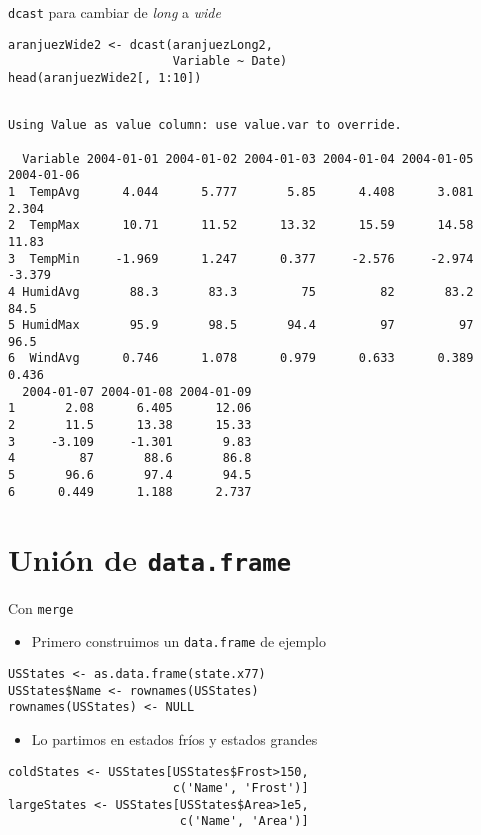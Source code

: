 \documentclass[xcolor={usenames,svgnames,dvipsnames}]{beamer}
\begin{document}
\begin{frame}[label={sec:org8553cc9},fragile]{\texttt{dcast} para cambiar de \emph{long} a \emph{wide}}
 \lstset{language=r,label= ,caption= ,captionpos=b,numbers=none}
\begin{lstlisting}
aranjuezWide2 <- dcast(aranjuezLong2,
                       Variable ~ Date)
head(aranjuezWide2[, 1:10])
\end{lstlisting}

\begin{verbatim}

Using Value as value column: use value.var to override.

  Variable 2004-01-01 2004-01-02 2004-01-03 2004-01-04 2004-01-05 2004-01-06
1  TempAvg      4.044      5.777       5.85      4.408      3.081      2.304
2  TempMax      10.71      11.52      13.32      15.59      14.58      11.83
3  TempMin     -1.969      1.247      0.377     -2.576     -2.974     -3.379
4 HumidAvg       88.3       83.3         75         82       83.2       84.5
5 HumidMax       95.9       98.5       94.4         97         97       96.5
6  WindAvg      0.746      1.078      0.979      0.633      0.389      0.436
  2004-01-07 2004-01-08 2004-01-09
1       2.08      6.405      12.06
2       11.5      13.38      15.33
3     -3.109     -1.301       9.83
4         87       88.6       86.8
5       96.6       97.4       94.5
6      0.449      1.188      2.737
\end{verbatim}
\end{frame}


\section{Unión de \texttt{data.frame}}
\label{sec:orge9ba0b8}
\begin{frame}[label={sec:orgfb1994b},fragile]{Con \texttt{merge}}
 \begin{itemize}
\item Primero construimos un \texttt{data.frame} de ejemplo
\end{itemize}
\lstset{language=r,label= ,caption= ,captionpos=b,numbers=none}
\begin{lstlisting}
USStates <- as.data.frame(state.x77)
USStates$Name <- rownames(USStates)
rownames(USStates) <- NULL
\end{lstlisting}

\begin{itemize}
\item Lo partimos en estados \guillemotleft{}fríos\guillemotright{} y estados \guillemotleft{}grandes\guillemotright{}
\end{itemize}
\lstset{language=r,label= ,caption= ,captionpos=b,numbers=none}
\begin{lstlisting}
coldStates <- USStates[USStates$Frost>150,
                       c('Name', 'Frost')]
largeStates <- USStates[USStates$Area>1e5,
                        c('Name', 'Area')]
\end{lstlisting}
\end{frame}
\end{document}
